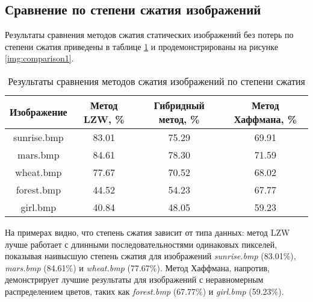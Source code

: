 \subsection{Сравнение по степени сжатия изображений}

Результаты сравнения методов сжатия статических изображений без потерь по степени сжатия приведены в таблице \ref{tbl:compression_ratio} и продемонстрированы на рисунке \ref{img:comparison1}.

\begin{table}[H]
    \centering
        \caption{Результаты сравнения методов сжатия изображений по степени сжатия}
        \label{tbl:compression_ratio}
        \begin{tabular}{|c|c|c|c|}
            \hline
            \textbf{Изображение}
            & \begin{minipage}[t]{4cm}\centering\textbf{Метод LZW, \%}\end{minipage} 
            & \begin{minipage}[t]{4cm}\centering\textbf{Гибридный метод, \%}\end{minipage}
            & \begin{minipage}[t]{4cm}\centering\textbf{Метод Хаффмана, \%}\end{minipage} \\ \hline
            sunrise.bmp &  83.01  &  75.29  &  69.91  \\ \hline
            mars.bmp    &  84.61  &  78.30  &  71.59  \\ \hline
            wheat.bmp   &  77.67  &  70.52  &  68.02  \\ \hline
            forest.bmp  &  44.52  &  54.23  &  67.77  \\ \hline
            girl.bmp    &  40.84  &  48.05  &  59.23  \\ \hline
        \end{tabular}
\end{table}


На примерах видно, что степень сжатия зависит от типа данных: метод LZW лучше работает с длинными последовательностями одинаковых пикселей, показывая наивысшую степень сжатия для изображений \textit{sunrise.bmp} (83.01\%), \textit{mars.bmp} (84.61\%) и \textit{wheat.bmp} (77.67\%). Метод Хаффмана, напротив, демонстрирует лучшие результаты для изображений с неравномерным распределением цветов, таких как \textit{forest.bmp} (67.77\%) и \textit{girl.bmp} (59.23\%).

